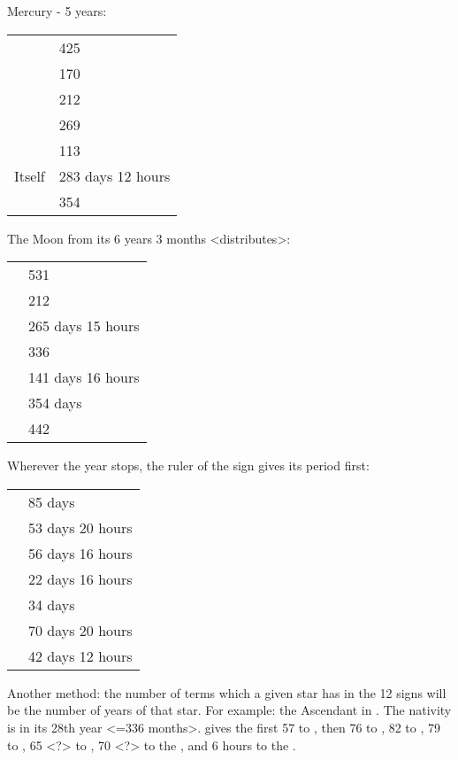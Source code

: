 Mercury - 5 years:
\begin{center}
\begin{tabular}{cl}
\Saturn		& 425 \\
\Jupiter		& 170 \\
\Mars 		& 212 \\
\Sun 			& 269 \\
\Venus 		& 113 \\
Itself		& 283 days 12 hours \\
\Moon			& 354 \\
\end{tabular}
\end{center}
\newpage

The Moon from its 6 years 3 months <distributes>:
\begin{center}
\begin{tabular}{cl}
\Saturn		& 531 \\
\Jupiter		& 212 \\
\Mars 		& 265 days 15 hours \\
\Sun 			& 336 \\
\Venus 		& 141 days 16 hours \\
\Mercury		& 354 days \\
\Moon			&  442 \\
\end{tabular}
\end{center}

Wherever the year stops, the ruler of the sign gives its period first:
\begin{center}
\begin{tabular}{cl}
\Saturn		& 85 days \\
\Sun 			& 53 days 20 hours \\
\Mercury		& 56 days 16 hours \\
\Venus 		& 22 days 16 hours \\
\Jupiter		& 34 days \\
\Moon 		& 70 days 20 hours \\
\Mars 		& 42 days 12 hours \\
\end{tabular}
\end{center}

Another method: the number of terms which a given star has in the 12 signs will be the number of years of that star. For example: the Ascendant in \Libra. The nativity is in its 28th year <=336 months>. \Capricorn\xspace gives the first 57 to \Saturn, then 76 to \Mercury, 82 to \Venus, 79 to \Jupiter, 65 <?> to \Mars, 70
<?> to the \Moon, and 6 hours to the \Sun.

